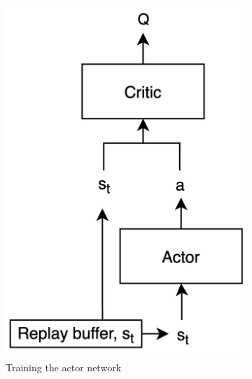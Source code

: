\begin{figure}[htb]
    \centering
    \begin{subfigure}[b]{0.38\textwidth}
        \centering
        \includegraphics[width=\textwidth]{figures/3_/3_4_training_actor.png}
        \caption{Training the actor network}
        \label{fig:3_4_actor}
    \end{subfigure}
    \hfill
    \begin{subfigure}[b]{0.6\textwidth}
        \centering

\end{subfigure}
\end{figure}
